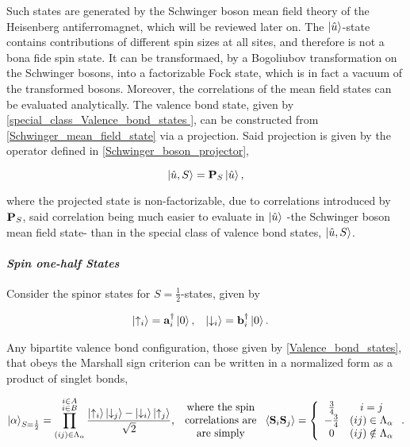 Such states are generated by the Schwinger boson mean field theory of the Heisenberg antiferromagnet, which will be reviewed later on. The $\ket{\hat{u}}$-state contains contributions of different spin sizes at all sites, and therefore is not a bona fide spin state. It can be transformaed, by a Bogoliubov transformation on the Schwinger bosons, into a factorizable Fock state, which is in fact a vacuum of the transformed bosons. Moreover, the correlations of the mean field states can be evaluated analytically. The valence bond state, given by \cref{special_class_Valence_bond_states }, can be constructed from \cref{Schwinger_mean_field_state} via a projection. Said projection is given by the operator defined in \cref{Schwinger_boson_projector},

$$
    \ket{\hat{u}, S} = \mathbf{P}_S \ket{\hat{u}},
$$

where the projected state is non-factorizable, due to correlations introduced by ${\bf P}_S$, said correlation being much easier to evaluate in $\ket{\hat{u}}$ -the Schwinger boson mean field state- than in the special class of valence bond states, $\ket{\hat{u}, S}$. \\

\paragraph{\textit{Spin one-half States}}

Consider the spinor states for $S = \frac{1}{2}$-states, given by 

\begin{align}
    \ket{\uparrow_i} &= {\bf a}_i^\dagger \ket{0}, & \ket{\downarrow_i} &= {\bf b}_i^\dagger  \ket{0}.
\end{align}

Any bipartite valence bond configuration, those given by \cref{Valence_bond_states}, that obeys the Marshall sign criterion can be written in a normalized form as a product of singlet bonds,

\begin{equation}
\begin{split}
    \ket{\alpha}_{S = \frac{1}{2}} = \prod_{(ij) \in \Lambda_{\alpha}}^{{\substack{{i \in A}\\
                                 {i \in B} }}}
    \frac{\ket{\uparrow_i}\ket{\downarrow_j}-\ket{\downarrow_i} \ket{\uparrow_j}}{\sqrt{2}},  \begin{array}{c}
         \textnormal{ where the spin }  \\
         \textnormal{ correlations are } \\
         \textnormal{ are simply } 
    \end{array} \langle {\bf S}_i {\bf S}_j \rangle = \left\{\begin{array}{cc}
         \frac{3}{4} & i = j  \\
         -\frac{3}{4} & (ij) \in \Lambda_{\alpha} \\
         0 & (ij) \notin \Lambda_{\alpha}
    \end{array}\right..
    \label{bipartite_valence_bond_states_corrs}
\end{split}
\end{equation}

